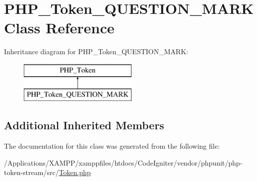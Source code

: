 \hypertarget{class_p_h_p___token___q_u_e_s_t_i_o_n___m_a_r_k}{}\section{P\+H\+P\+\_\+\+Token\+\_\+\+Q\+U\+E\+S\+T\+I\+O\+N\+\_\+\+M\+A\+RK Class Reference}
\label{class_p_h_p___token___q_u_e_s_t_i_o_n___m_a_r_k}
Inheritance diagram for P\+H\+P\+\_\+\+Token\+\_\+\+Q\+U\+E\+S\+T\+I\+O\+N\+\_\+\+M\+A\+RK\+:\begin{figure}[H]
\begin{center}
\leavevmode
\includegraphics[height=2.000000cm]{class_p_h_p___token___q_u_e_s_t_i_o_n___m_a_r_k}
\end{center}
\end{figure}
\subsection*{Additional Inherited Members}


The documentation for this class was generated from the following file\+:\begin{DoxyCompactItemize}
\item 
/\+Applications/\+X\+A\+M\+P\+P/xamppfiles/htdocs/\+Code\+Igniter/vendor/phpunit/php-\/token-\/stream/src/\mbox{\hyperlink{_token_8php}{Token.\+php}}\end{DoxyCompactItemize}
